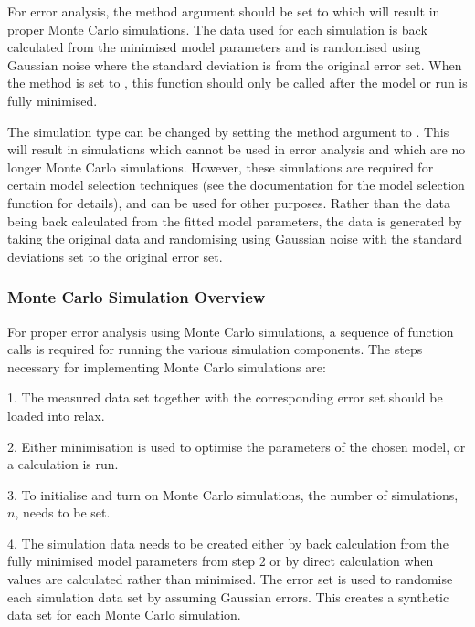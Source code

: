 For error analysis, the method argument should be set to 
 which will result in
proper Monte Carlo simulations.  The data used for each simulation is back calculated from
the minimised  model parameters and is randomised using Gaussian noise where the standard
deviation is from the original error set.  When the method is set to 
, this
function should only be called after the model or run is fully minimised. 

The simulation type can be changed by setting the method argument to 
.  This will
result in simulations which cannot be used in error analysis and which are no longer Monte
Carlo simulations.  However, these simulations are required for certain model selection
techniques (see the documentation for the model selection function for details), and can be
used for other purposes.  Rather than the data being back calculated from the fitted model
parameters, the data is generated by taking the original data and randomising using Gaussian
noise with the standard deviations set to the original error set.



\subsubsection{Monte Carlo Simulation Overview}

For proper error analysis using Monte Carlo simulations, a sequence  of function calls is
required for running the various simulation components.  The steps necessary for
implementing Monte Carlo simulations are:

1.  The measured data set together with the corresponding error set should be loaded into
relax.

2.  Either minimisation  is used to optimise  the parameters of the chosen model, or a
calculation is run.

3.  To initialise and turn on Monte Carlo simulations, the number of simulations, $n$, needs
to be set.

4.  The simulation data needs to be created either by back calculation from the fully
minimised  model parameters from step 2 or by direct calculation when values are calculated
rather than minimised.   The error set is used to randomise each simulation data set by
assuming Gaussian errors.  This creates a synthetic data set for each Monte Carlo
simulation.

